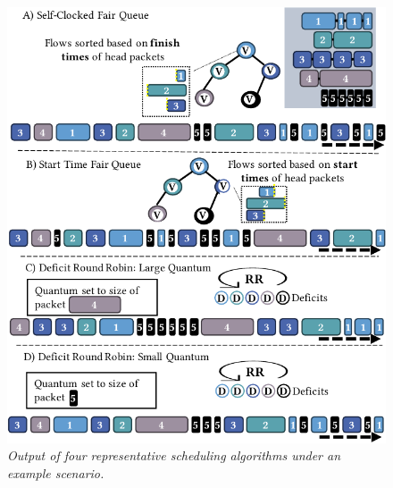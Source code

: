 \begin{figure}[t]
    \centering
    \includegraphics[width=0.85\linewidth]{figs/demo-scrr2-crop.pdf}
    \vspace{-4mm}
    \caption{\small{\textit{Output of four representative scheduling algorithms under an example scenario.}}}
	\label{fig:demo}
 \vspace{-5mm}
\end{figure}

